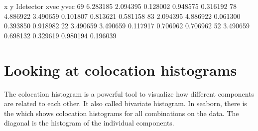 \documentclass[letterpaper,10pt,english]{sphinxmanual}
\begin{document}
\begin{sphinxVerbatim}[commandchars=\\\{\}]
\PYG{p}{[}\PYG{p}{]}    \PYG{p}{[}\PYG{p}{]}\PYG{p}{[}\PYG{p}{]}\PYG{p}{[}\PYG{p}{]} 
\PYG{p}{[}\PYG{p}{]}    \PYG{p}{[}\PYG{p}{]}\PYG{p}{[}\PYG{p}{]}\PYG{p}{[}\PYG{p}{]} 

\end{sphinxVerbatim}

\begin{sphinxVerbatim}[commandchars=\\\{\}]
           x         y  I\PYGZus{}detector     x\PYGZus{}vec     y\PYGZus{}vec
69  6.283185  2.094395    0.128002  0.948575  0.316192
78  4.886922  3.490659    0.101807  0.813621  0.581158
83 \PYGZhy{}2.094395  4.886922    0.061300 \PYGZhy{}0.393850  0.918982
22 \PYGZhy{}3.490659 \PYGZhy{}3.490659   \PYGZhy{}0.117917 \PYGZhy{}0.706962 \PYGZhy{}0.706962
52 \PYGZhy{}3.490659  0.698132    0.329619 \PYGZhy{}0.980194  0.196039
\end{sphinxVerbatim}


\section{Looking at colocation histograms}
\label{\detokenize{04-BasicSegmentation:looking-at-colocation-histograms}}
\sphinxAtStartPar
The colocation histogram is a powerful tool to visualize how different components are related to each other. It also called bi\sphinxhyphen{}variate histogram. In seaborn, there is the  which shows colocation histograms for all combinations on the data. The diagonal is the histogram of the individual components.
\end{document}
